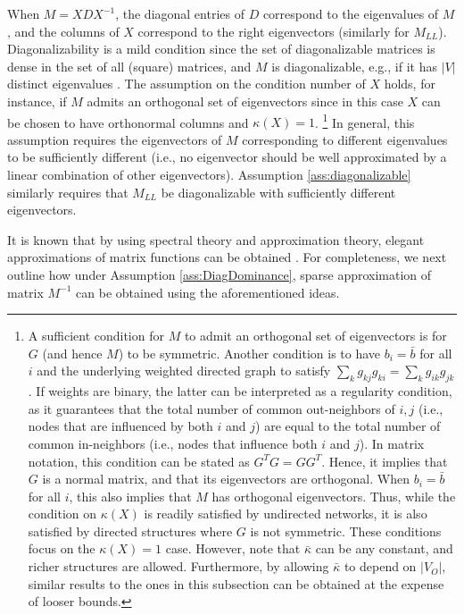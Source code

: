 \documentclass[opre,nonblindrev]{informs3} %
\begin{document}
When
$M= X D X^{-1}$,
the diagonal entries of $D$ correspond to the eigenvalues of $M$, and the columns of $X$ correspond to the right eigenvectors (similarly for $M_{LL}$).
Diagonalizability is a mild condition since the set of diagonalizable matrices is dense in the set of all (square) matrices, and $M$ is diagonalizable, e.g.,
if it has $|V|$ distinct eigenvalues \citep{golub2012matrix}.
The  assumption on the condition number  of $X$ holds, for instance, if $M$ admits an orthogonal set of eigenvectors since in this case $X$ can be chosen to have orthonormal columns and $\kappa(X)=1$.
\footnote{A sufficient condition for
	$M$ to admit an orthogonal set of eigenvectors is for $G$ (and hence $M$) to be symmetric.
	Another condition is to have
	$b_i=\bar{b}$ for all $i$ and
	the underlying weighted directed graph to
	satisfy $\sum_k g_{kj} g_{ki}= \sum_k g_{ik} g_{jk}$.
	If weights are binary, the latter
	can be interpreted as a regularity condition,
	as it guarantees that the total number of common out-neighbors of $i,j$ (i.e., nodes that are influenced by both $i$ and $j$) are equal to the total number of common in-neighbors (i.e., nodes that influence both $i$ and $j$). In matrix notation, this condition can be stated as $G^T G = G G^T$. Hence, it implies that $G$ is a normal matrix, and that its eigenvectors are orthogonal.
	When $b_i=\bar{b}$ for all $i$, this also implies that $M$ has orthogonal eigenvectors.
	Thus, while
	the condition on $\kappa(X)$ is readily satisfied by
	 undirected networks, it is also satisfied by  
	 directed structures where $G$ is not symmetric. These conditions focus on the $\kappa(X)=1$ case. However, note that $\bar{\kappa}$ can be any constant, and richer structures are allowed. Furthermore, by allowing $\bar{\kappa}$ to depend on $|V_O|$, similar results to the ones in this subsection can be obtained at the expense of looser bounds.}
In general, this assumption requires the eigenvectors of $M$ corresponding to different eigenvalues to be sufficiently different (i.e., no eigenvector should be well approximated by a linear combination of other eigenvectors).
Assumption \ref{ass:diagonalizable} similarly requires that
$M_{LL}$ be diagonalizable with sufficiently different eigenvectors.


It is known that by using
spectral theory and approximation theory,
elegant approximations of
matrix functions can be obtained
\citep[see, e.g.,][]{demko1984decay,benzi2007decay}.
For completeness, we next outline how
under  Assumption \ref{ass:DiagDominance},
sparse approximation of matrix $M^{-1}$  can be obtained using the aforementioned ideas.
 
\end{document}
